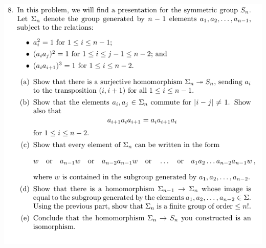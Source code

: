 \documentclass[12pt,letterpaper,boxed]{hmcpset}
\begin{document}
\newpage


\begin{problem}[4]
	\hfill
\end{problem}

\begin{solution}
\end{solution}

\newpage


\begin{problem}
	\includegraphics[scale=0.8]{8.png}
	\hfill
\end{problem}
\end{document}
